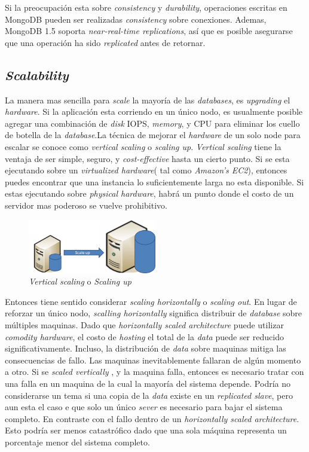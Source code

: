 Si la preocupación esta sobre \textit{consistency} y \textit{durability}, operaciones escritas en MongoDB pueden ser realizadas \textit{consistency} sobre conexiones. Ademas, MongoDB 1.5 soporta \textit{near-real-time replications}, así que es posible asegurarse que una operación ha sido \textit{replicated} antes de retornar.

\subsection{\textit{Scalability}}
La manera mas sencilla para \textit{scale} la mayoría de las \textit{databases}, es \textit{upgrading} el \textit{hardware}. Si la aplicación esta corriendo en un único nodo, es usualmente posible agregar una combinación de \textit{disk} IOPS, \textit{memory}, y CPU para eliminar los cuello de botella de la \textit{database}.La técnica de mejorar el \textit{hardware} de un solo node para escalar se conoce como \textit{vertical scaling} o \textit{scaling up}. \textit{Vertical scaling} tiene la ventaja de ser simple, seguro, y \textit{cost-effective} hasta un cierto punto. Si se esta ejecutando sobre un \textit{virtualized hardware}( tal como \textit{Amazon's EC2}), entonces puedes encontrar que una instancia lo suficientemente larga no esta disponible. Si estas ejecutando sobre \textit{physical hardware}, habrá un punto donde el costo de un servidor mas poderoso se vuelve prohibitivo.

\begin{figure}[h!]
	\centering
	\includegraphics[width=0.5\textwidth]{figuras/cap2/scale_up.png}
	\caption{\textit{Vertical scaling} o \textit{Scaling up} }
\end{figure}

Entonces tiene sentido  considerar \textit{scaling horizontally} o \textit{scaling out}. En lugar de reforzar un único nodo, \textit{scalling horizontally} significa distribuir de \textit{database} sobre múltiples maquinas. Dado que \textit{horizontally scaled architecture} puede utilizar \textit{comodity hardware}, el costo de \textit{hosting} el total de la \textit{data} puede ser reducido significativamente. Incluso, la distribución  de \textit{data} sobre maquinas mitiga las consecuencias de fallo. Las maquinas inevitablemente fallaran de algún momento a otro. Si se \textit{scaled vertically} , y la maquina falla, entonces es necesario tratar con una falla en un maquina de la cual la mayoría del sistema depende. Podría no considerarse un tema si una copia de la \textit{data} existe en un \textit{replicated slave}, pero aun esta el caso e que solo un único \textit{sever} es necesario para bajar el sistema completo. En contraste con el fallo dentro de un \textit{horizontally scaled architecture}. Esto podría ser menos catastrófico dado que una sola máquina representa un porcentaje menor del sistema completo.

